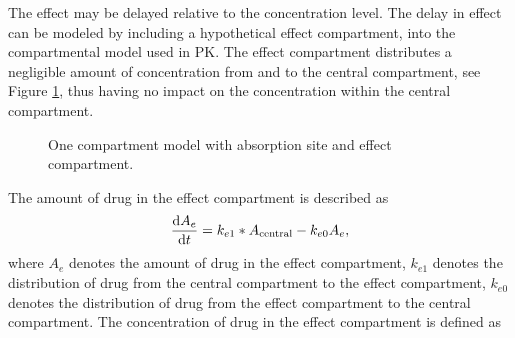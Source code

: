 The effect may be delayed relative to the concentration level. The delay in effect can be modeled by including a hypothetical effect compartment, into the compartmental model used in PK. The effect compartment distributes a negligible amount of concentration from and to the central compartment, see Figure \ref{fig: One-compartment model with effect}, thus having no impact on the concentration within the central compartment.
\begin{figure}[H]
    \centering
    \caption{One compartment model with absorption site and effect compartment.}
    \label{fig: One-compartment model with effect}
\end{figure}
The amount of drug in the effect compartment is described as
\begin{align} \label{eq: Concentration in effect compartment}
    \frac{\mathrm{d} A_e}{\mathrm{d}t} = k_{e1} * A_{\text{central}} - k_{e0} A_e,
\end{align}
where $A_e$ denotes the amount of drug in the effect compartment, $k_{e1}$ denotes the distribution of drug from the central compartment to the effect compartment, $k_{e0}$ denotes the distribution of drug from the effect compartment to the central compartment. The concentration of drug in the effect compartment is defined as
